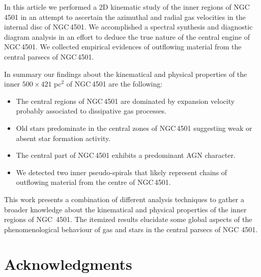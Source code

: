 \documentclass[fleqn,usenatbib]{mnras}
\begin{document}
In this article we performed a 2D kinematic study of the inner regions of NGC\,4501 in an attempt to ascertain the azimuthal and radial gas velocities
in the internal disc of NGC\,4501. We accomplished a spectral synthesis and diagnostic diagram analysis in an effort to deduce the true nature of the 
central engine of NGC\,4501. We collected empirical evidences of outflowing material from the central parsecs of NGC\,4501. 

In summary our findings about the kinematical and physical properties of the inner $500 \times 421$ pc$^2$ of NGC\,4501 are the following:

\begin{itemize}
 \item The central regions of NGC\,4501 are dominated by expansion velocity probably associated to dissipative gas processes. 
 \item Old stars predominate in the central zones of NGC\,4501 suggesting weak or absent star formation activity. 
 \item The central part of NGC\,4501 exhibits a predominant AGN character.
 \item We detected two inner pseudo-spirals that likely represent chains of outflowing material from the centre of NGC\,4501. 
\end{itemize}

This work presents a combination of different analysis techniques to gather a broader knowledge about the kinematical and physical properties
of the inner regions of \mbox{NGC 4501}. The itemized results elucidate some global aspects of the phenomenological behaviour of gas and stars in the central
parsecs of NGC 4501.

\section*{Acknowledgments}
\end{document}

